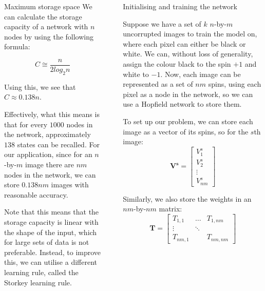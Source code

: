 \documentclass[25pt, a0paper, portrait]{beamer}
\newlength{\sepwidth}
\newlength{\colwidth}
\newcommand{\separatorcolumn}{\begin{column}{\sepwidth}\end{column}}
\begin{document}
\begin{frame}[t]
\begin{columns}[t]
\begin{column}{\colwidth}
\begin{block}{Maximum storage space}
    We can calculate the storage capacity of a network with $n$ nodes by using the following
    formula:

    \begin{equation} \label{recall_percentage}
      C \cong \frac{n}{2log_2n}
    \end{equation}

    Using this, we see that $C \approx 0.138n$. \cite{fncom:2017}

    Effectively, what this means is that for every $1000$ nodes in the network, approximately
    $138$ states can be recalled. For our application, since for an $n$-by-$m$ image there are
    $nm$ nodes in the network, we can store $0.138nm$ images with reasonable accuracy.

    Note that this means that the storage capacity is linear with the shape of the input,
    which for large sets of data is not preferable. Instead, to improve this, we can utilise a
    different learning rule, called the Storkey learning rule. \cite{storkey:1997}
  \end{block}

\end{column}

\separatorcolumn

\begin{column}{\colwidth}

  \begin{block}{Initialising and training the network} \small

    Suppose we have a set of $k$ $n$-by-$m$ uncorrupted images to train the model on,
    where each pixel can either be black or white.
    We can, without loss of generality, assign the colour black to the spin $+1$
    and white to $-1$. Now, each image can be represented as a set of $nm$ spins, 
    using each pixel as a node in the network, so we can use a Hopfield network to 
    store them.

    To set up our problem, we can store each image as a vector of its spins, so for
    the $s$th image:
    \begin{equation*}
      \boldsymbol{V^s} = \begin{bmatrix}
        V^s_1 \\
        V^s_2 \\
        \vdots \\
        V^s_{nm}
      \end{bmatrix}
    \end{equation*}

    Similarly, we also store the weights in an $nm$-by-$nm$ matrix:
    \begin{equation*}
      \boldsymbol{T} = \begin{bmatrix}
        T_{1,1}   & \dots   & T_{1,nm}\\
        \vdots      & \ddots  & \\
        T_{nm,1}  &         & T_{nm,nm}
      \end{bmatrix}
    \end{equation*}


\end{block}
\end{column}
\end{columns}
\end{frame}
\end{document}
